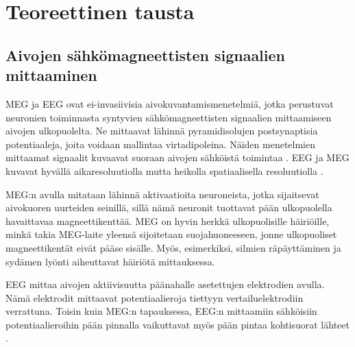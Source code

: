 \section{Teoreettinen tausta}



\subsection{Aivojen sähkömagneettisten signaalien mittaaminen}

MEG ja EEG ovat ei-invasiivisia aivokuvantamismenetelmiä, jotka perustuvat neuronien toiminnasta syntyvien sähkömagneettisten signaalien mittaamiseen aivojen ulkopuolelta. Ne mittaavat lähinnä pyramidisolujen postsynaptisia potentiaaleja, joita voidaan mallintaa virtadipoleina. Näiden menetelmien mittaamat signaalit kuvaavat suoraan aivojen sähköistä toimintaa \citep{Baillet2001ElectromagneticMapping}. EEG ja MEG kuvavat hyvällä aikaresoluutiolla mutta heikolla spatiaalisella resoluutiolla \citep{He2018ElectrophysiologicalDynamics}.

MEG:n avulla mitataan lähinnä aktivaatioita neuroneista, jotka sijaitsevat aivokuoren uurteiden seinillä, sillä nämä neuronit tuottavat pään ulkopuolella havaittavaa magneettikenttää. \citep[s. 4--5]{hansen2010meg} MEG on hyvin herkkä ulkopuolisille häiriöille, minkä takia MEG-laite yleensä sijoitetaan suojahuoneeseen, jonne ulkopuoliset magneettikentät eivät pääse sisälle. Myös, esimerkiksi, silmien räpäyttäminen ja sydämen lyönti aiheuttavat häiriötä mittauksessa. \citep{Hamalainen1993MagnetoencephalographytheoryBrain}

EEG mittaa aivojen aktiivisuutta päänahalle asetettujen elektrodien avulla. Nämä elektrodit mittaavat potentiaalieroja tiettyyn vertailuelektrodiin verrattuna. \citep{Michel2004EEGImaging} Toisin kuin MEG:n tapauksessa, EEG:n mittaamiin sähköisiin potentiaalieroihin pään pinnalla vaikuttavat myös pään pintaa kohtisuorat lähteet \citep[s. 10]{HariMEGprimer}.
